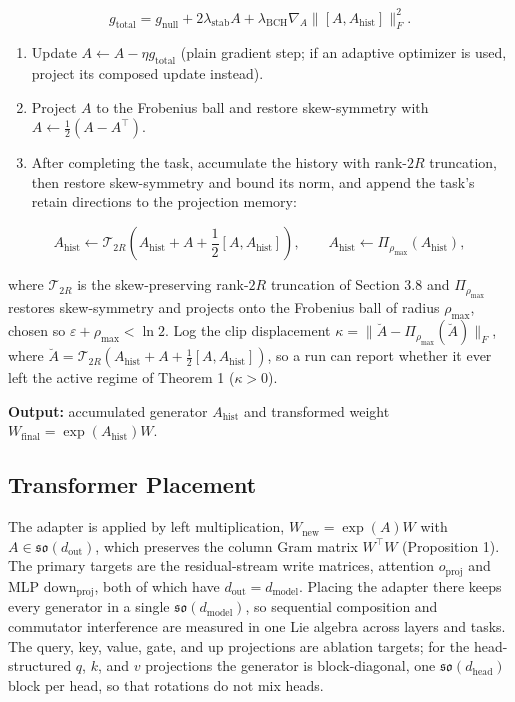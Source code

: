 \documentclass[
]{article}
\providecommand{\tightlist}{%
  \setlength{\itemsep}{0pt}\setlength{\parskip}{0pt}}
\begin{document}
\[
g_{\mathrm{total}}
=g_{\mathrm{null}}+2\lambda_{\mathrm{stab}}A
+\lambda_{\mathrm{BCH}}\nabla_A\|[A,A_{\mathrm{hist}}]\|_F^2.
\]

\begin{enumerate}
\def\labelenumi{\arabic{enumi}.}
\setcounter{enumi}{6}
\tightlist
\item
  Update \(A\leftarrow A-\eta g_{\mathrm{total}}\) (plain gradient step; if an adaptive optimizer is used, project its composed update instead).
\item
  Project \(A\) to the Frobenius ball and restore skew-symmetry with \(A\leftarrow\frac{1}{2}(A-A^\top)\).
\item
  After completing the task, accumulate the history with rank-\(2R\) truncation, then restore skew-symmetry and bound its norm, and append the task's retain directions to the projection memory:
\end{enumerate}

\[
A_{\mathrm{hist}}\leftarrow
\mathcal{T}_{2R}\!\left(A_{\mathrm{hist}}+A+\frac{1}{2}[A,A_{\mathrm{hist}}]\right),
\qquad
A_{\mathrm{hist}}\leftarrow \Pi_{\rho_{\max}}(A_{\mathrm{hist}}),
\]

where \(\mathcal{T}_{2R}\) is the skew-preserving rank-\(2R\) truncation of Section 3.8 and \(\Pi_{\rho_{\max}}\) restores skew-symmetry and projects onto the Frobenius ball of radius \(\rho_{\max}\), chosen so \(\varepsilon+\rho_{\max}<\ln 2\). Log the clip displacement \(\kappa=\|\breve{A}-\Pi_{\rho_{\max}}(\breve{A})\|_F\), where \(\breve{A}=\mathcal{T}_{2R}(A_{\mathrm{hist}}+A+\tfrac{1}{2}[A,A_{\mathrm{hist}}])\), so a run can report whether it ever left the active regime of Theorem 1 (\(\kappa>0\)).

\textbf{Output:} accumulated generator \(A_{\mathrm{hist}}\) and transformed weight \(W_{\mathrm{final}}=\exp(A_{\mathrm{hist}})W\).

\subsection{Transformer Placement}\label{transformer-placement}

The adapter is applied by left multiplication, \(W_{\mathrm{new}}=\exp(A)W\) with \(A\in\mathfrak{so}(d_{\mathrm{out}})\), which preserves the column Gram matrix \(W^\top W\) (Proposition 1). The primary targets are the residual-stream write matrices, attention \(o_{\mathrm{proj}}\) and MLP \(\mathrm{down}_{\mathrm{proj}}\), both of which have \(d_{\mathrm{out}}=d_{\mathrm{model}}\). Placing the adapter there keeps every generator in a single \(\mathfrak{so}(d_{\mathrm{model}})\), so sequential composition and commutator interference are measured in one Lie algebra across layers and tasks. The query, key, value, gate, and up projections are ablation targets; for the head-structured \(q\), \(k\), and \(v\) projections the generator is block-diagonal, one \(\mathfrak{so}(d_{\mathrm{head}})\) block per head, so that rotations do not mix heads.
\end{document}
